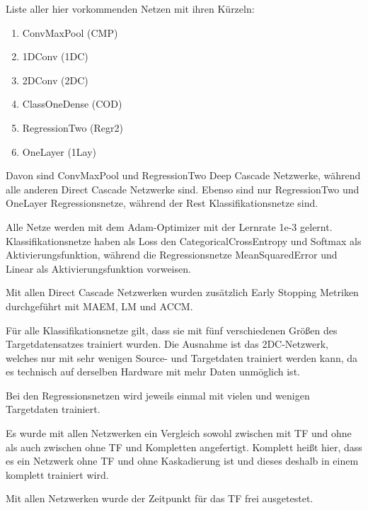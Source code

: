 
Liste aller hier vorkommenden Netzen mit ihren Kürzeln:

\begin{enumerate}
    \item ConvMaxPool (CMP)
    \item 1DConv (1DC)
    \item 2DConv (2DC)
    \item ClassOneDense (COD)
    \item RegressionTwo (Regr2)
    \item OneLayer (1Lay)
\end{enumerate}

Davon sind ConvMaxPool und RegressionTwo Deep Cascade Netzwerke, während alle anderen Direct Cascade Netzwerke sind. 
Ebenso sind nur RegressionTwo und OneLayer Regressionsnetze, während der Rest Klassifikationsnetze sind. 

Alle Netze werden mit dem Adam-Optimizer mit der Lernrate 1e-3 gelernt. Klassifikationsnetze haben als Loss den 
CategoricalCrossEntropy und Softmax als Aktivierungsfunktion, während die Regressionsnetze MeanSquaredError und Linear als 
Aktivierungsfunktion vorweisen. 

Mit allen Direct Cascade Netzwerken wurden zusätzlich Early Stopping Metriken durchgeführt mit MAEM, LM und ACCM. 

Für alle Klassifikationsnetze gilt, dass sie mit fünf verschiedenen Größen des Targetdatensatzes trainiert wurden. Die Ausnahme ist das 
2DC-Netzwerk, welches nur mit sehr wenigen Source- und Targetdaten trainiert werden kann, da es technisch auf derselben Hardware mit mehr 
Daten unmöglich ist. 

Bei den Regressionsnetzen wird jeweils einmal mit vielen und wenigen Targetdaten trainiert. 


Es wurde mit allen Netzwerken ein Vergleich sowohl zwischen mit TF und ohne als auch zwischen ohne TF und Kompletten angefertigt. 
Komplett heißt hier, dass es ein Netzwerk ohne TF und ohne Kaskadierung ist und dieses deshalb in einem komplett trainiert wird. 

Mit allen Netzwerken wurde der Zeitpunkt für das TF frei ausgetestet. 

